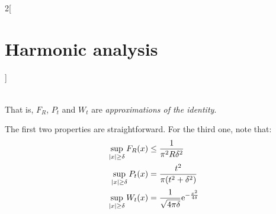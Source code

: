 \documentclass[../../../main_math.tex]{subfiles}
\begin{document}
\begin{multicols}{2}[\section{Harmonic analysis}]
\begin{proposition}
\begin{enumerate}
\begin{multline*}
            \end{multline*}
    \end{enumerate}
    That is, $F_R$, $P_t$ and $W_t$ are \emph{approximations of the identity}.
  \end{proposition}
  \begin{sproof}
    The first two properties are straightforward. For the third one, note that:
    \begin{align*}
      \sup_{\abs{x}\geq \delta}F_R(x) & \leq \frac{1}{\pi^2 R \delta^2}                        \\
      \sup_{\abs{x}\geq \delta}P_t(x) & =\frac{t^2}{\pi(t^2+\delta^2)}                         \\
      \sup_{\abs{x}\geq \delta}W_t(x) & =\frac{1}{\sqrt{4\pi\delta}}\mathrm{e}^{-\frac{x^2}{4\delta}}
    \end{align*}


\end{sproof}
\end{multicols}
\end{document}
